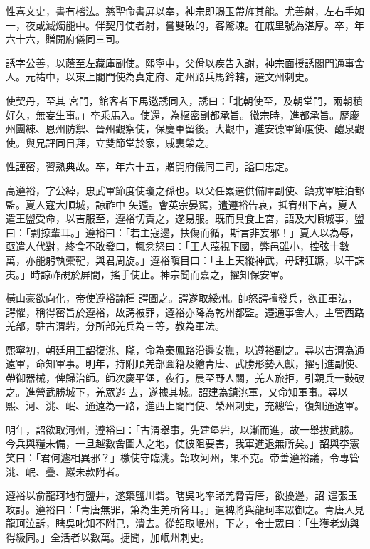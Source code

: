 \begin{pinyinscope}
 性喜文史，書有楷法。慈聖命書屏以奉，神宗即賜玉帶旌其能。尤善射，左右手如一，夜或滅燭能中。伴契丹使者射，嘗雙破的，客驚竦。在戚里號為湛厚。卒，年六十六，贈開府儀同三司。



 誘字公善，以蔭至左藏庫副使。熙寧中，父佾以疾告入謝，神宗面授誘閣門通事舍人。元祐中，以東上閣門使為真定府、定州路兵馬鈐轄，遷文州刺史。



 使契丹，至其
 宮門，館客者下馬邀誘同入，誘曰：「北朝使至，及朝堂門，兩朝積好久，無妄生事。」卒乘馬入。使還，為樞密副都承旨。徽宗時，進都承旨。歷慶州團練、恩州防禦、晉州觀察使，保慶軍留後。大觀中，進安德軍節度使、醴泉觀使。與兄評同日拜，立雙節堂於家，戚裏榮之。



 性謹密，習熟典故。卒，年六十五，贈開府儀同三司，謚曰忠定。



 高遵裕，字公綽，忠武軍節度使瓊之孫也。以父任累遷供備庫副使、鎮戎軍駐泊都監。夏人寇大順城，諒祚中
 矢遁。會英宗晏駕，遣遵裕告哀，抵宥州下宮，夏人遣王盥受命，以吉服至，遵裕切責之，遂易服。既而具食上宮，語及大順城事，盥曰：「剽掠輩耳。」遵裕曰：「若主寇邊，扶傷而循，斯言非妄邪！」夏人以為辱，亟遣人代對，終食不敢發口，輒忿怒曰：「王人蔑視下國，弊邑雖小，控弦十數萬，亦能躬執橐鞬，與君周旋。」遵裕瞋目曰：「主上天縱神武，毋肆狂蹶，以干誅夷。」時諒祚覘於屏間，搖手使止。神宗聞而嘉之，擢知保安軍。



 橫山豪欲向化，帝使遵裕諭種
 諤圖之。諤遂取綏州。帥怒諤擅發兵，欲正軍法，諤懼，稱得密旨於遵裕，故諤被罪，遵裕亦降為乾州都監。遷通事舍人，主管西路羌部，駐古渭砦，分所部羌兵為三等，教為軍法。



 熙寧初，朝廷用王韶復洮、隴，命為秦鳳路沿邊安撫，以遵裕副之。尋以古渭為通遠軍，命知軍事。明年，持附順羌部圖籍及繪青唐、武勝形勢入獻，擢引進副使、帶御器械，俾歸治師。師次慶平堡，夜行，晨至野人關，羌人旅拒，引親兵一鼓破之。進營武勝城下，羌眾逃
 去，遂據其城。詔建為鎮洮軍，又命知軍事。尋以熙、河、洮、岷、通遠為一路，進西上閣門使、榮州刺史，充總管，復知通遠軍。



 明年，韶欲取河州，遵裕曰：「古渭舉事，先建堡砦，以漸而進，故一舉拔武勝。今兵與糧未備，一旦越數舍圖人之地，使彼阻要害，我軍進退無所矣。」韶與李憲笑曰：「君何遽相異邪？」檄使守臨洮。韶攻河州，果不克。帝善遵裕議，令專管洮、岷、疊、巖未款附者。



 遵裕以俞龍珂地有鹽井，遂築鹽川砦。瞎吳叱率諸羌脅青唐，欲擾邊，詔
 遣張玉攻討。遵裕曰：「青唐無罪，第為生羌所脅耳。」遣裨將與龍珂率眾御之。青唐人見龍珂泣訴，瞎吳叱知不附己，潰去。從韶取岷州，下之，令士眾曰：「生獲老幼與得級同。」全活者以數萬。捷聞，加岷州刺史。




\end{pinyinscope}
